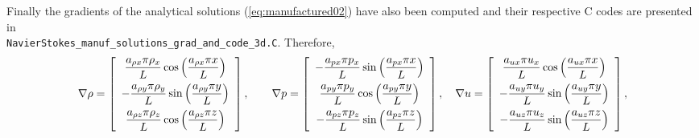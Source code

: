 \documentclass[10pt]{article}
\begin{document}
\begin{landscape}
Finally the gradients of the analytical solutions (\ref{eq:manufactured02}) have also been computed and their respective C codes are presented in \\ \texttt{NavierStokes\_manuf\_solutions\_grad\_and\_code\_3d.C}. Therefore,
\begin{equation}
\nabla  \rho= \left[ \begin{array}{c}
 \dfrac{  a_{\rho x}  \pi \rho_x}{L} \cos\left( \dfrac{ a_{\rho x}  \pi  x}{L}\right)\vspace{5pt} \\
-\dfrac{  a_{\rho y}  \pi \rho_y}{L} \sin\left( \dfrac{ a_{\rho y}  \pi  y}{L}\right)\vspace{5pt}\\
 \dfrac{  a_{\rho z}  \pi \rho_z}{L}  \cos\left( \dfrac{ a_{\rho z}  \pi  z}{L}\right)
\end{array} \right],
\qquad
\nabla p = \left[ \begin{array}{c}
- \dfrac{  a_{px}  \pi p_x}{L} \sin\left( \dfrac{ a_{px}  \pi  x}{L}\right)\vspace{5pt}\\
  \dfrac{  a_{py}  \pi p_y}{L} \cos\left( \dfrac{ a_{py}  \pi  y}{L}\right) \vspace{5pt}\\
- \dfrac{  a_{pz}  \pi p_z}{L} \sin\left( \dfrac{ a_{pz}  \pi  z}{L}\right)
\end{array} \right],
\quad
\nabla u = \left[ \begin{array}{c}
  \dfrac{  a_{ux}  \pi u_x}{L} \cos\left( \dfrac{ a_{ux}  \pi  x}{L}\right)\vspace{5pt}\\
 -   \dfrac{  a_{uy}  \pi u_y}{L} \sin\left( \dfrac{ a_{uy}  \pi  y}{L}\right)\vspace{5pt}\\
 -   \dfrac{  a_{uz}  \pi u_z}{L} \sin\left( \dfrac{ a_{uz}  \pi  z}{L}\right)
\end{array} \right],
\end{equation}


\end{landscape}
\end{document}
